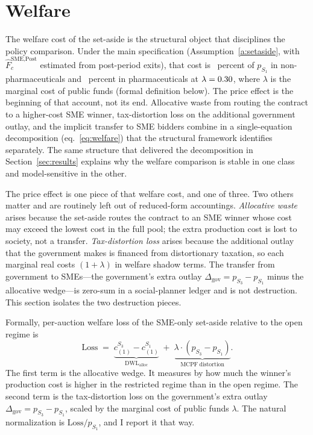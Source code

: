 \section{Welfare}\label{sec:welfare}

The welfare cost of the set-aside is the structural object that disciplines the policy comparison. Under the main specification (Assumption~\ref{a:setaside}, with $\hat F_c^{\text{SME,Post}}$ estimated from post-period exits), that cost is \welfLossPctLthirtyNp~percent of $p_{S_1}$ in non-pharmaceuticals and \welfLossPctLthirtyPh~percent in pharmaceuticals at $\lambda = 0.30$, where $\lambda$ is the marginal cost of public funds (formal definition below). The price effect is the beginning of that account, not its end. Allocative waste from routing the contract to a higher-cost SME winner, tax-distortion loss on the additional government outlay, and the implicit transfer to SME bidders combine in a single-equation decomposition (eq.~\ref{eq:welfare}) that the structural framework identifies separately. The same structure that delivered the decomposition in Section~\ref{sec:results} explains why the welfare comparison is stable in one class and model-sensitive in the other.

The price effect is one piece of that welfare cost, and one of three. Two others matter and are routinely left out of reduced-form accountings. \emph{Allocative waste} arises because the set-aside routes the contract to an SME winner whose cost may exceed the lowest cost in the full pool; the extra production cost is lost to society, not a transfer. \emph{Tax-distortion loss} arises because the additional outlay that the government makes is financed from distortionary taxation, so each marginal real costs $(1+\lambda)$ in welfare shadow terms. The transfer from government to SMEs---the government's extra outlay $\Delta_{\text{gov}} = p_{S_3} - p_{S_1}$ minus the allocative wedge---is zero-sum in a social-planner ledger and is not destruction. This section isolates the two destruction pieces.

Formally, per-auction welfare loss of the SME-only set-aside relative to the open regime is
\begin{equation}\label{eq:welfare}
\mathrm{Loss} \;=\; \underbrace{c_{(1)}^{S_3} - c_{(1)}^{S_1}}_{\mathrm{DWL}_{\text{alloc}}}
\;+\; \underbrace{\lambda \cdot (p_{S_3} - p_{S_1})}_{\mathrm{MCPF\ distortion}}.
\end{equation}
The first term is the allocative wedge. It measures by how much the winner's production cost is higher in the restricted regime than in the open regime. The second term is the tax-distortion loss on the government's extra outlay $\Delta_{\text{gov}} = p_{S_3} - p_{S_1}$, scaled by the marginal cost of public funds $\lambda$. The natural normalization is $\mathrm{Loss} / p_{S_1}$, and I report it that way.

